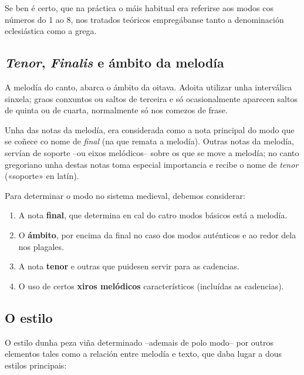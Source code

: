 \documentclass[spanish, a4paper,nobind]{templates/ociamthesis}
\providecommand{\tightlist}{%
  \setlength{\itemsep}{0pt}\setlength{\parskip}{0pt}}
\begin{document}
Se ben é certo, que na práctica o máis habitual era referirse aos modos cos números do 1 ao 8, nos tratados teóricos empregábanse tanto a denominación eclesiástica como a grega.

\hypertarget{tenor-finalis-e-uxe1mbito-da-meloduxeda}{%
\subsection*{\texorpdfstring{\emph{Tenor}, \emph{Finalis} e ámbito da melodía}{Tenor, Finalis e ámbito da melodía}}\label{tenor-finalis-e-uxe1mbito-da-meloduxeda}}

A melodía do canto, abarca o ámbito da oitava. Adoita utilizar unha interválica sinxela; graos conxuntos ou saltos de terceira e só ocasionalmente aparecen saltos de quinta ou de cuarta, normalmente só nos comezos de frase.

Unha das notas da melodía, era considerada como a nota principal do modo que se coñece co nome de \emph{final} (na que remata a melodía). Outras notas da melodía, servían de soporte --ou eixos melódicos-- sobre os que se move a melodía; no canto gregoriano unha destas notas toma especial importancia e recibe o nome de \emph{tenor} («soporte» en latín).

Para determinar o modo no sistema medieval, debemos considerar:

\begin{enumerate}
\def\labelenumi{\arabic{enumi}.}
\tightlist
\item
  A nota \textbf{final}, que determina en cal do catro modos básicos está a melodía.
\item
  O \textbf{ámbito}, por encima da final no caso dos modos auténticos e ao redor dela nos plagales.
\item
  A nota \textbf{tenor} e outras que puidesen servir para as cadencias.
\item
  O uso de certos \textbf{xiros melódicos} característicos (incluídas as cadencias).
\end{enumerate}

\hypertarget{o-estilo}{%
\subsection*{O estilo}\label{o-estilo}}

O estilo dunha peza viña determinado --ademais de polo modo-- por outros elementos tales como a relación entre melodía e texto, que daba lugar a dous estilos principais:
\end{document}
